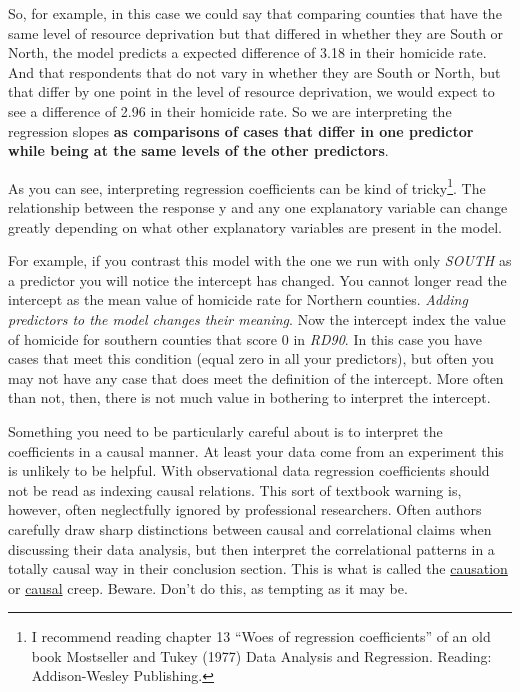 \documentclass[]{book}
\begin{document}
So, for example, in this case we could say that comparing counties that have the same level of resource deprivation but that differed in whether they are South or North, the model predicts a expected difference of 3.18 in their homicide rate. And that respondents that do not vary in whether they are South or North, but that differ by one point in the level of resource deprivation, we would expect to see a difference of 2.96 in their homicide rate. So we are interpreting the regression slopes \textbf{as comparisons of cases that differ in one predictor while being at the same levels of the other predictors}.

As you can see, interpreting regression coefficients can be kind of tricky\footnote{I recommend reading chapter 13 ``Woes of regression coefficients'' of an old book Mostseller and Tukey (1977) Data Analysis and Regression. Reading: Addison-Wesley Publishing.}. The relationship between the response y and any one explanatory variable can change greatly depending on what other explanatory variables are present in the model.

For example, if you contrast this model with the one we run with only \emph{SOUTH} as a predictor you will notice the intercept has changed. You cannot longer read the intercept as the mean value of homicide rate for Northern counties. \emph{Adding predictors to the model changes their meaning}. Now the intercept index the value of homicide for southern counties that score 0 in \emph{RD90}. In this case you have cases that meet this condition (equal zero in all your predictors), but often you may not have any case that does meet the definition of the intercept. More often than not, then, there is not much value in bothering to interpret the intercept.

Something you need to be particularly careful about is to interpret the coefficients in a causal manner. At least your data come from an experiment this is unlikely to be helpful. With observational data regression coefficients should not be read as indexing causal relations. This sort of textbook warning is, however, often neglectfully ignored by professional researchers. Often authors carefully draw sharp distinctions between causal and correlational claims when discussing their data analysis, but then interpret the correlational patterns in a totally causal way in their conclusion section. This is what is called the \href{http://junkcharts.typepad.com/numbersruleyourworld/2012/07/the-causation-creep.html}{causation} or \href{http://www.carlislerainey.com/2012/12/05/another-example-of-causal-creep/}{causal} creep. Beware. Don't do this, as tempting as it may be.
\end{document}
